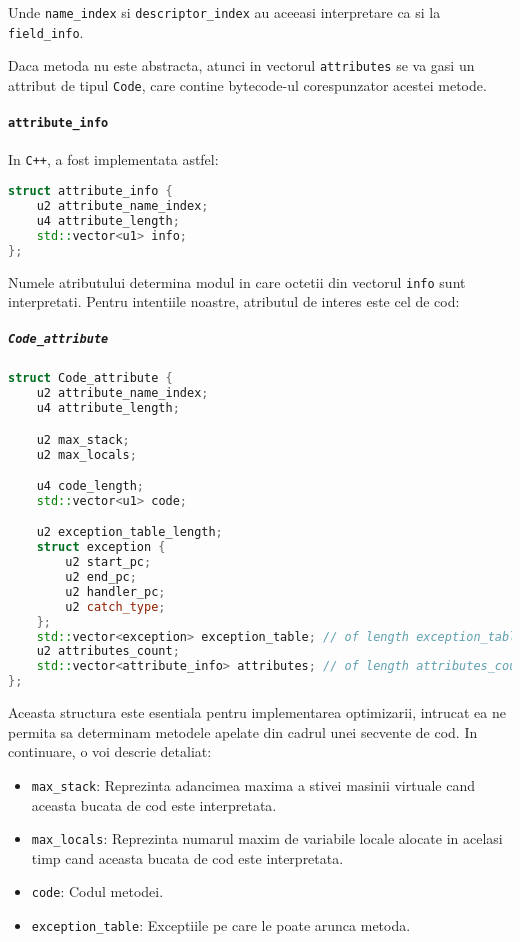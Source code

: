 Unde \texttt{name\_index} si \texttt{descriptor\_index} au aceeasi
interpretare ca si la \texttt{field\_info}.

Daca metoda nu este abstracta, atunci in vectorul \texttt{attributes} se
va gasi un attribut de tipul \texttt{Code}, care contine bytecode-ul
corespunzator acestei metode.

\paragraph{\texorpdfstring{\texttt{attribute\_info}}{attribute\_info}}\label{attribute_info}

In \texttt{C++}, a fost implementata astfel:

\begin{lstlisting}[language=C++]
struct attribute_info {
    u2 attribute_name_index;
    u4 attribute_length;
    std::vector<u1> info;
};
\end{lstlisting}

Numele atributului determina modul in care octetii din vectorul
\texttt{info} sunt interpretati. Pentru intentiile noastre, atributul de
interes este cel de cod:

\subparagraph{\texorpdfstring{\texttt{Code\_attribute}}{Code\_attribute}}\label{code_attribute}

\begin{lstlisting}[language=C++]
struct Code_attribute {
    u2 attribute_name_index;
    u4 attribute_length;

    u2 max_stack;
    u2 max_locals;

    u4 code_length;
    std::vector<u1> code;

    u2 exception_table_length;
    struct exception {
        u2 start_pc;
        u2 end_pc;
        u2 handler_pc;
        u2 catch_type;
    };
    std::vector<exception> exception_table; // of length exception_table_length.
    u2 attributes_count;
    std::vector<attribute_info> attributes; // of length attributes_count.
};
\end{lstlisting}

Aceasta structura este esentiala pentru implementarea
optimizarii, intrucat ea ne permita sa determinam metodele
apelate din cadrul unei secvente de cod.
In continuare, o voi descrie detaliat:

\begin{itemize}
	\tightlist
	\item
	      \texttt{max\_stack}: Reprezinta adancimea maxima a stivei masinii
	      virtuale cand aceasta bucata de cod este interpretata.
	\item
	      \texttt{max\_locals}: Reprezinta numarul maxim de variabile locale
	      alocate in acelasi timp cand aceasta bucata de cod este interpretata.
	\item
	      \texttt{code}: Codul metodei.
	\item
	      \texttt{exception\_table}: Exceptiile pe care le poate arunca metoda.
\end{itemize}

